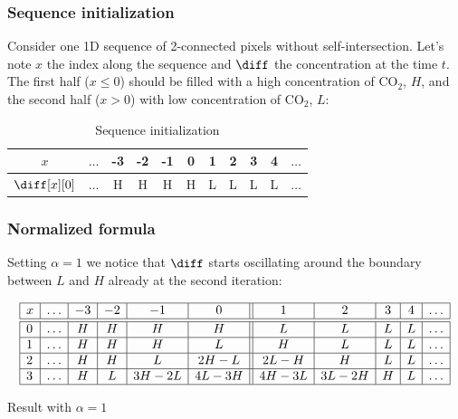\subsubsection{Sequence initialization}

Consider one 1D sequence of 2-connected pixels without self-intersection.
Let's note $x$ the index along the sequence and $\diff$ the concentration at the 
time $t$. The first half ($x \le 0$) should be filled with a high concentration
of $\mathrm{CO_2}$, $H$, and the second half ($x > 0$) with low concentration 
of $\mathrm{CO_2}$, $L$:

\begin{table}[ht]
    \centering
    \begin{tabular}{|c|c|c|c|c|c||c|c|c|c|c|} \hline
        $x$           & $\ldots$ &-3 &-2 &-1 & 0 & 1 & 2 & 3 & 4 & $\ldots$ \\ \hline \hline
        $\diff[x][0]$ & $\ldots$ & H & H & H & H & L & L & L & L & $\ldots$ \\ \hline
    \end{tabular}
    \caption{Sequence initialization}
    \label{tab:init}
\end{table}

\subsubsection{Normalized formula}

Setting $\alpha=1$ we notice that $\diff$ starts oscillating 
around the boundary between $L$ and $H$ already at the second iteration:

\begin{table}[ht]
    \centering
    $$
        \begin{array}{|l|c|c|c|c|c||c|c|c|c|c|} \hline
        x&\ldots &-3 &-2 &-1   & 0   & 1    & 2   & 3 & 4 & \ldots \\ \hline \hline
        0&\ldots & H & H & H   & H   & L    & L   & L & L & \ldots \\ \hline
        1&\ldots & H & H & H   & L   & H    & L   & L & L & \ldots \\ \hline
        2&\ldots & H & H & L   &2H-L & 2L-H & H   & L & L & \ldots \\ \hline
        3&\ldots & H & L &3H-2L&4L-3H& 4H-3L&3L-2H& H & L & \ldots \\ \hline 
        \end{array}
    $$
    \caption{Result with $\alpha=1$}
    \label{tab:1D:result_a1}
\end{table}

